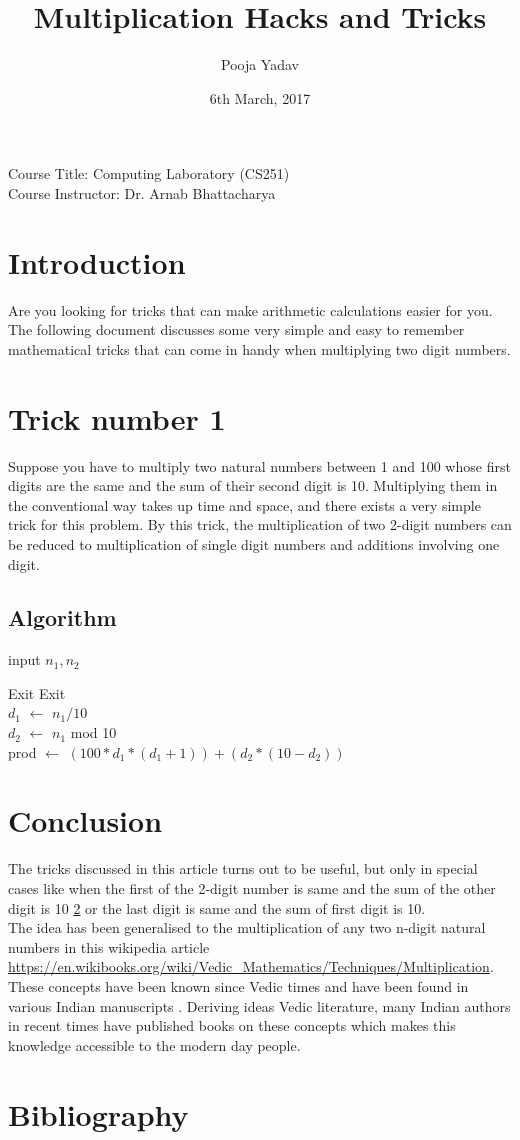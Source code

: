 \documentclass[12pt, a4paper]{article}
\title{Multiplication Hacks and Tricks}
\author{Pooja Yadav}
\date{6th March, 2017}
\begin{document}
\begin{titlepage}
\maketitle
\vspace{4cm}
\centering
Course Title: Computing Laboratory (CS251)\\
Course Instructor: Dr. Arnab Bhattacharya
\end{titlepage}
\section{Introduction}
Are you looking for tricks that can make arithmetic calculations easier for you. The following document discusses some very simple and easy to remember mathematical tricks that can come in handy when multiplying two digit numbers.
\section{Trick number 1}
\label{sec1}
Suppose you have to multiply two natural numbers between 1 and 100 whose first digits are the same and the sum of their second digit is 10. Multiplying them in the conventional way takes up time and space, and there exists a very simple trick for this problem. By this trick, the multiplication of two 2-digit numbers can be reduced to multiplication of single digit numbers and additions involving one digit.
\subsection{Algorithm}
\begin{algorithm}[H]
input $n_1, n_2$
\begin{algorithmic}[1]
\State Exit
\EndIf
{}
\State Exit
\EndIf
\\
$d_1$ $\gets$ $n_1/10$ \\ 
$d_2$ $\gets$ $n_1$ mod 10 \\
prod $\gets$ $(100*d_1*(d_1+1)) + (d_2 * (10 - d_2))$ \\
\end{algorithmic}
\end{algorithm}
\section{Conclusion}
	The tricks discussed in this article turns out to be useful, but only in special cases like when the first of the 2-digit number is same and the sum of the other digit is 10 \ref{sec1} or the last digit is same and the sum of first digit is 10.\\
	The idea has been generalised to the multiplication of any two n-digit natural numbers in this wikipedia article \url{https://en.wikibooks.org/wiki/Vedic_Mathematics/Techniques/Multiplication}. These concepts have been known since Vedic times and have been found in various Indian manuscripts \cite{Book2}. Deriving ideas Vedic literature, many Indian authors in recent times have published books on these concepts \cite{Book1} which makes this knowledge accessible to the modern day people. 
\section{Bibliography}


\end{document}
